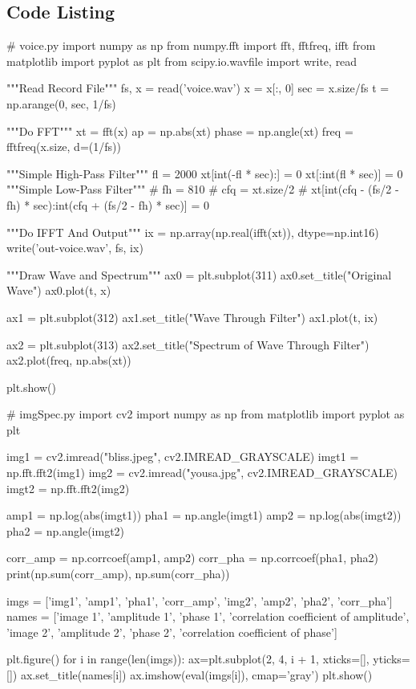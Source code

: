 \documentclass{article}
\begin{document}
\begin{appendices}
\section{Code Listing}
\begin{python}
# voice.py
import numpy as np
from numpy.fft import fft, fftfreq, ifft
from matplotlib import pyplot as plt
from scipy.io.wavfile import write, read

"""Read Record File"""
fs, x = read('voice.wav')
x = x[:, 0]
sec = x.size/fs
t = np.arange(0, sec, 1/fs)

"""Do FFT"""
xt = fft(x)
ap = np.abs(xt)
phase = np.angle(xt)
freq = fftfreq(x.size, d=(1/fs))

"""Simple High-Pass Filter"""
fl = 2000
xt[int(-fl * sec):] = 0
xt[:int(fl * sec)] = 0
"""Simple Low-Pass Filter"""
# fh = 810
# cfq = xt.size/2
# xt[int(cfq - (fs/2 - fh) * sec):int(cfq + (fs/2 - fh) * sec)] = 0

"""Do IFFT And Output"""
ix = np.array(np.real(ifft(xt)), dtype=np.int16)
write('out-voice.wav', fs, ix)

"""Draw Wave and Spectrum"""
ax0 = plt.subplot(311)
ax0.set_title("Original Wave")
ax0.plot(t, x)

ax1 = plt.subplot(312) 
ax1.set_title("Wave Through Filter")
ax1.plot(t, ix)

ax2 = plt.subplot(313)
ax2.set_title("Spectrum of Wave Through Filter")
ax2.plot(freq, np.abs(xt))

plt.show()


\end{python}

\begin{python}
# imgSpec.py
import cv2
import numpy as np 
from matplotlib import pyplot as plt

img1 = cv2.imread("bliss.jpeg", cv2.IMREAD_GRAYSCALE)
imgt1 = np.fft.fft2(img1)
img2 = cv2.imread("yousa.jpg", cv2.IMREAD_GRAYSCALE)
imgt2 = np.fft.fft2(img2)

amp1 = np.log(abs(imgt1))
pha1 = np.angle(imgt1)
amp2 = np.log(abs(imgt2))
pha2 = np.angle(imgt2)

corr_amp = np.corrcoef(amp1, amp2)
corr_pha = np.corrcoef(pha1, pha2)
print(np.sum(corr_amp), np.sum(corr_pha))

imgs = ['img1', 'amp1', 'pha1', 'corr_amp', 'img2', 'amp2', 'pha2', 'corr_pha']
names = ['image 1', 'amplitude 1', 'phase 1', 'correlation coefficient of amplitude', 'image 2', 'amplitude 2', 'phase 2', 'correlation coefficient of phase']

plt.figure()
for i in range(len(imgs)):
    ax=plt.subplot(2, 4, i + 1, xticks=[], yticks=[])
    ax.set_title(names[i])
    ax.imshow(eval(imgs[i]), cmap='gray')
plt.show()
\end{python}
\end{appendices}
\end{document}
